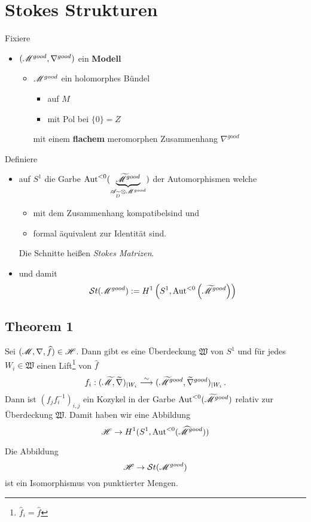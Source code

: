 \section{Stokes Strukturen} %
Fixiere
\begin{itemize}
  \item $(\mathscr{M}^{good},\nabla^{good})$ ein \textbf{Modell}
    \begin{itemize}
      \item $\mathscr{M}^{good}$ ein holomorphes Bündel
        \begin{itemize}
          \item auf $M$
          \item mit Pol bei $\{0\}=Z$
        \end{itemize}
        mit einem \textbf{flachem} meromorphen Zusammenhang $\nabla^{good}$
    \end{itemize}
\end{itemize}
\begin{defn}
  Definiere
  \begin{itemize}
    \item auf $S^1$ die Garbe
      $\operatorname{Aut}^{<0}(\underset{\mathscr{A}_{\widetilde D}\otimes\mathscr{M}^{good}}
      {\underbrace{\widetilde{\mathscr{M}}^{good}}})$ der Automorphismen
      welche
      \begin{itemize}
        \item mit dem Zusammenhang kompatibel\TODO[in Formeln] sind und
        \item formal äquivalent zur Identität sind.
      \end{itemize}
      Die Schnitte heißen \emph{Stokes Matrizen}.
    \item und damit
      \[
        \mathcal{S}{}t(\mathscr{M}^{good})
          :=H^1\left(S^1,\operatorname{Aut}^{<0}\left(\widetilde {\mathscr{M}}^{good}\right)\right)
      \]
  \end{itemize}
\end{defn}

\subsection{Theorem 1} %
Sei $(\mathscr{M},\nabla,\widehat f)\in\mathscr{H}$. Dann gibt es eine Überdeckung
$\mathfrak{W}$ von $S^1$ und für jedes $W_i\in\mathfrak{W}$ einen
Lift\footnote{$\hat f_i=\hat f$} von $\hat f$
\[
  f_i:(\widetilde{\mathscr{M}},\widetilde\nabla)_{|W_i}
  \overset{\sim}{\longrightarrow}
  (\widetilde{\mathscr{M}}^{good},\widetilde\nabla^{good})_{|W_i} \,.
\]
Dann ist $(f_jf_i^{-1})_{i,j}$ ein Kozykel in der Garbe
$\operatorname{Aut}^{<0}(\widetilde{\mathscr{M}}^{good})$ relativ zur Überdeckung $\mathfrak{W}$.
Damit haben wir eine Abbildung
\[
  \mathscr{H}\to H^1(S^1,\operatorname{Aut}^{<0}(\widehat {\mathscr{M}}^{good}))
\]
\begin{thm}
  Die Abbildung
  \[
    \mathscr{H}\to\mathcal{S}{}t(\mathscr{M}^{good})
  \]
  ist ein Isomorphismus von punktierter Mengen.
\end{thm}
